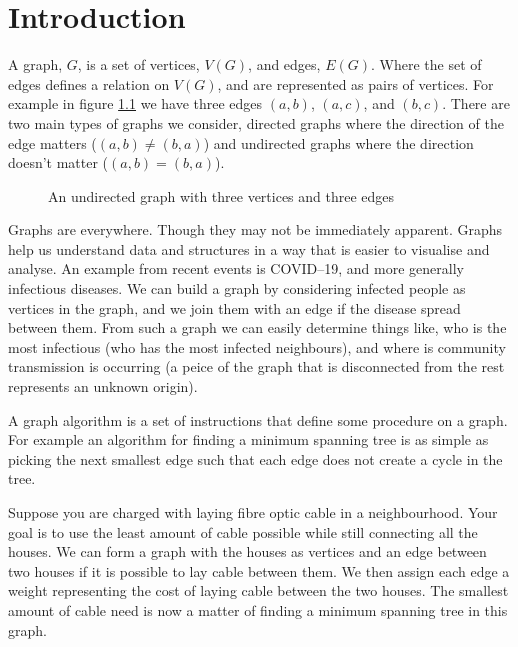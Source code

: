 \chapter{Introduction}\label{chpt:into}
A graph, $G$, is a set of vertices, $V(G)$, and edges, $E(G)$. Where the set of edges defines a relation on $V(G)$, and are represented as pairs of vertices. For example in figure \ref{fig:k3} we have three edges $(a,b)$, $(a,c)$, and $(b,c)$. There are two main types of graphs we consider, directed graphs where the direction of the edge matters ($(a,b)\neq (b,a)$) and undirected graphs where the direction doesn't matter ($(a,b)=(b,a)$).

\begin{figure}[h]
    \centering
{}
    \caption{An undirected graph with three vertices and three edges}
\label{fig:k3}
\end{figure}
   
Graphs are everywhere. Though they may not be immediately apparent. 
Graphs help us understand data and structures in a way that is easier to visualise and analyse. An example from recent events is COVID--19, and more generally infectious diseases.  We can build a graph by considering infected people as vertices in the graph, and we join them with an edge if the disease spread between them. %
From such a graph we can easily determine things like, who is the most infectious (who has the most infected neighbours), and where is community transmission is occurring (a peice of the graph that is disconnected from the rest represents an unknown origin).
     
A graph algorithm is a set of instructions that define some procedure on a graph. 
For example an algorithm for finding a minimum spanning tree is as simple as picking the next smallest edge such that each edge does not create a cycle in the tree.  

Suppose you are charged with laying fibre optic cable in a neighbourhood. Your goal is to use the least amount of cable possible while still connecting all the houses. We can form a graph with the houses as vertices and an edge between two houses if it is possible to lay cable between them. We then assign each edge a weight representing the cost of laying cable between the two houses. The smallest amount of cable need is now a matter of finding a minimum spanning tree in this graph. 
   
